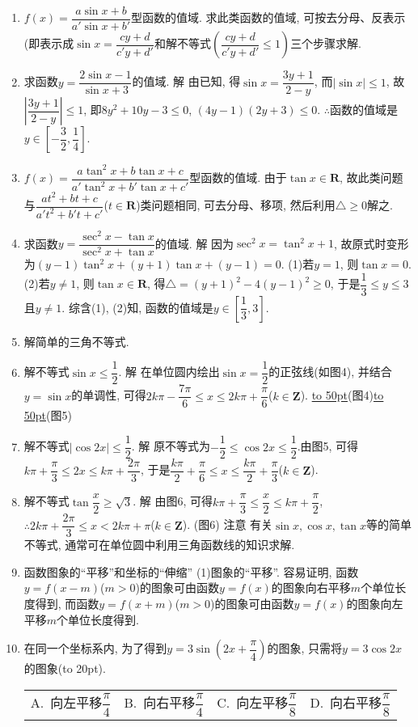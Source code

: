 \documentclass[10pt,a4paper]{article}
\newcommand{\blank}[1]{\underline{\hbox to #1pt{}}}
\newcommand{\bracket}[1]{(\hbox to #1pt{})}
\newcommand{\fourch}[4]{\par\begin{tabular}{p{.23\textwidth}p{.23\textwidth}p{.23\textwidth}p{.23\textwidth}}
A.~#1 &B.~#2& C.~#3& D.~#4
\end{tabular}}
\begin{document}
\begin{enumerate}[1.]
\item $f(x)=\dfrac{a\sin x+b}{a'\sin x+b'}$型函数的值域.
求此类函数的值域, 可按去分母、反表示(即表示成$\sin x=\dfrac{cy+d}{c'y+d'}$和解不等式$(\dfrac{cy+d}{c'y+d'}\le 1)$三个步骤求解.
\item 求函数$y=\dfrac{2\sin x-1}{\sin x+3}$的值域.
解  由已知, 得$\sin x=\dfrac{3y+1}{2-y}$, 而$|\sin x|\le 1$, 故$|\dfrac{3y+1}{2-y}|\le 1$,
即$8y^2+10y-3\le 0$, $(4y-1)(2y+3)\le 0$.  $\therefore$函数的值域是$y\in [-\dfrac 32,\dfrac 14]$.
\item $f(x)=\dfrac{a\tan ^2x+b\tan x+c}{a'\tan ^2x+b'\tan x+c'}$型函数的值域.
由于$\tan x\in \mathbf{R}$, 故此类问题与$\dfrac{at^2+bt+c}{a't^2+b't+c'}$($t\in \mathbf{R}$)类问题相同, 可去分母、移项, 然后利用$\triangle \ge 0$解之.
\item 求函数$y=\dfrac{\sec ^2x-\tan x}{\sec ^2x+\tan x}$的值域.
解  因为$\sec ^2x=\tan ^2x+1$, 故原式时变形为$(y-1)\tan ^2x+(y+1)\tan x+(y-1)=0$.
(1)若$y=1$, 则$\tan x=0$.
(2)若$y\ne 1$, 则$\tan x\in \mathbf{R}$, 得$\triangle =(y+1)^2-4(y-1)^2\ge 0$, 于是$\dfrac 13\le y\le 3$且$y\ne 1$.
综含(1), (2)知, 函数的值域是$y\in [\dfrac 13,3]$.
\item 解简单的三角不等式.
\item 解不等式$\sin x\le \dfrac 12$.
解  在单位圆内绘出$\sin x=\dfrac 12$的正弦线(如图4), 并结合$y=\sin x$的单调性, 可得$2k\pi -\dfrac{7\pi }6\le x\le 2k\pi +\dfrac{\pi }6$($k\in \mathbf{Z}$).
\blank{50}(图4)\blank{50}(图5)
\item 解不等式$|\cos 2x|\le \dfrac 12$.
解  原不等式为$-\dfrac 12\le \cos 2x\le \dfrac 12$.由图5, 可得$k\pi +\dfrac{\pi }3\le 2x\le k\pi +\dfrac{2\pi }3$,
于是$\dfrac{k\pi }2+\dfrac{\pi }6\le x\le \dfrac{k\pi }2+\dfrac{\pi }3$($k\in \mathbf{Z}$).
\item 解不等式$\tan \dfrac x2\ge \sqrt 3$.
解  由图6, 可得$k\pi +\dfrac{\pi }3\le \dfrac x2\le k\pi +\dfrac{\pi }2$,
$\therefore 2k\pi +\dfrac{2\pi }3\le x<2k\pi +\pi$($k\in \mathbf{Z}$).
(图6)
注意  有关$\sin x,\cos x,\tan x$等的简单不等式, 通常可在单位圆中利用三角函数线的知识求解.
\item 函数图象的``平移''和坐标的``伸缩''
(1)图象的``平移''.
容易证明, 函数$y=f(x-m)$($m>0$)的图象可由函数$y=f(x)$的图象向右平移$m$个单位长度得到, 而函数$y=f(x+m)$($m>0$)的图象可由函数$y=f(x)$的图象向左平移$m$个单位长度得到.
\item 在同一个坐标系内, 为了得到$y=3\sin (2x+\dfrac{\pi }4)$的图象, 只需将$y=3\cos 2x$的图象\bracket{20}.
\fourch{向左平移$\dfrac{\pi }4$}{向右平移$\dfrac{\pi }4$}{向左平移$\dfrac{\pi }8$}{向右平移$\dfrac{\pi }8$}

\end{enumerate}
\end{document}
